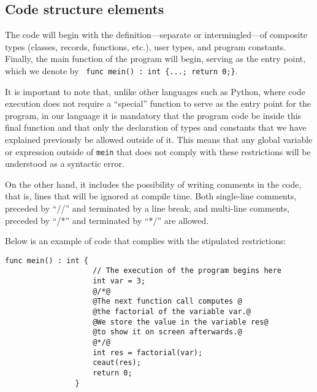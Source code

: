 \documentclass[10pt,a4paper]{article}
\begin{document}
\subsection{Code structure elements}\label{subsec:Elementos de la estructura del código}
The code will begin with the definition—separate or intermingled—of composite types (classes, records, functions, etc.), user types, and program constants. Finally, the main function of the program will begin, serving as the entry point, which we denote by \texttt{\color{blue} func mein() : int \{...; return 0;\}}.

It is important to note that, unlike other languages such as Python, where code execution does not require a “special” function to serve as the entry point for the program, in our language it is mandatory that the program code be inside this final function and that only the declaration of types and constants that we have explained previously be allowed outside of it. This means that any global variable or expression outside of \texttt{mein} that does not comply with these restrictions will be understood as a syntactic error.

On the other hand, it includes the possibility of writing comments in the code, that is, lines that will be ignored at compile time. Both single-line comments, preceded by ``//'' and terminated by a line break, and multi-line comments, preceded by ``/*'' and terminated by ``*/'' are allowed.

Below is an example of code that complies with the stipulated restrictions:

\begin{center}
    \begin{minipage}{\linewidth}
        \begin{lstlisting}[linewidth=0.7\linewidth, gobble=16]
                func mein() : int {
                    // The execution of the program begins here
                    int var = 3;
                    @/*@
                    @The next function call computes @
                    @the factorial of the variable var.@
                    @We store the value in the variable res@
                    @to show it on screen afterwards.@
                    @*/@
                    int res = factorial(var);
                    ceaut(res);
                    return 0;
                }
        \end{lstlisting}
    \end{minipage}
\end{center}
\end{document}
